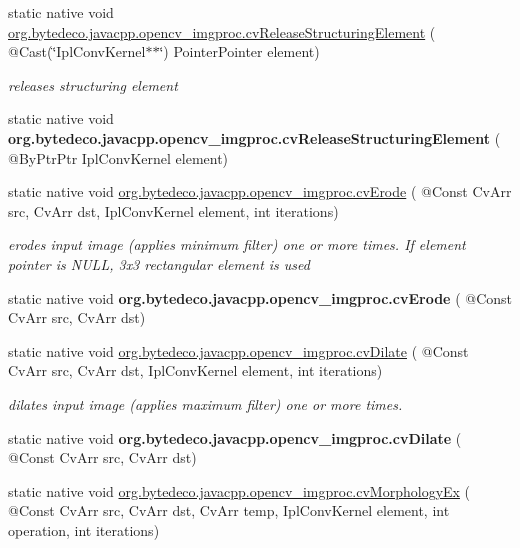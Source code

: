 \begin{DoxyCompactItemize}
\item 
static native void \hyperlink{group__imgproc__c_gaddb6b08638fde5f3641e96a7b033f774}{org.\+bytedeco.\+javacpp.\+opencv\+\_\+imgproc.\+cv\+Release\+Structuring\+Element} ( @Cast(\char`\"{}Ipl\+Conv\+Kernel$\ast$$\ast$\char`\"{}) Pointer\+Pointer element)
\begin{DoxyCompactList}\small\item\em releases structuring element \end{DoxyCompactList}\item 
\mbox{\label{group__imgproc__c_gafe1d188e339ae1fafafcc85b94cc3b2e}} 
static native void {\bfseries org.\+bytedeco.\+javacpp.\+opencv\+\_\+imgproc.\+cv\+Release\+Structuring\+Element} ( @By\+Ptr\+Ptr Ipl\+Conv\+Kernel element)
\item 
static native void \hyperlink{group__imgproc__c_ga8b958e2b5185910eba9b44400bb1d3b8}{org.\+bytedeco.\+javacpp.\+opencv\+\_\+imgproc.\+cv\+Erode} ( @Const Cv\+Arr src, Cv\+Arr dst, Ipl\+Conv\+Kernel element, int iterations)
\begin{DoxyCompactList}\small\item\em erodes input image (applies minimum filter) one or more times. If element pointer is N\+U\+LL, 3x3 rectangular element is used \end{DoxyCompactList}\item 
\mbox{\label{group__imgproc__c_gaf5b6c3c481dc803ff1742d4bdccb7c88}} 
static native void {\bfseries org.\+bytedeco.\+javacpp.\+opencv\+\_\+imgproc.\+cv\+Erode} ( @Const Cv\+Arr src, Cv\+Arr dst)
\item 
static native void \hyperlink{group__imgproc__c_gae80f82cb5e9876985e59aec2267f7ad4}{org.\+bytedeco.\+javacpp.\+opencv\+\_\+imgproc.\+cv\+Dilate} ( @Const Cv\+Arr src, Cv\+Arr dst, Ipl\+Conv\+Kernel element, int iterations)
\begin{DoxyCompactList}\small\item\em dilates input image (applies maximum filter) one or more times. \end{DoxyCompactList}\item 
\mbox{\label{group__imgproc__c_ga5cbfe8a5809a1b032a196fe10853f31d}} 
static native void {\bfseries org.\+bytedeco.\+javacpp.\+opencv\+\_\+imgproc.\+cv\+Dilate} ( @Const Cv\+Arr src, Cv\+Arr dst)
\item 
static native void \hyperlink{group__imgproc__c_ga09edd651f402b82f067e6de776bbd197}{org.\+bytedeco.\+javacpp.\+opencv\+\_\+imgproc.\+cv\+Morphology\+Ex} ( @Const Cv\+Arr src, Cv\+Arr dst, Cv\+Arr temp, Ipl\+Conv\+Kernel element, int operation, int iterations)
$$
\end{DoxyCompactItemize}
